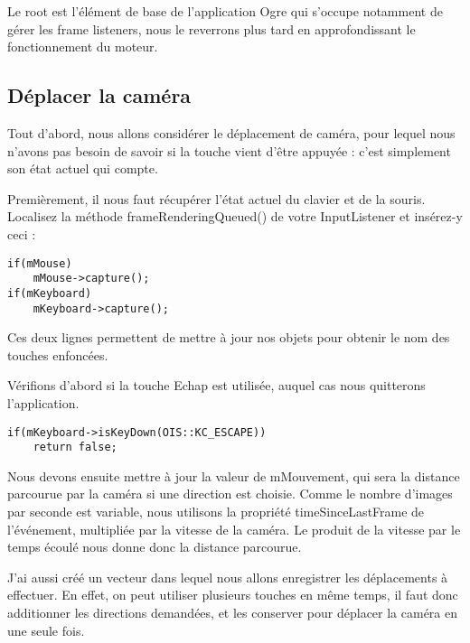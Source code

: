 Le root est l'\'el\'ement de base de l'application Ogre qui s'occupe notamment de g\'erer les frame listeners, nous le reverrons plus tard en approfondissant le fonctionnement du moteur.
 









\subsection{D\'eplacer la cam\'era}


Tout d'abord, nous allons consid\'erer le d\'eplacement de cam\'era, pour lequel nous n'avons pas besoin de savoir si la touche vient d'\^etre appuy\'ee : c'est simplement son \'etat actuel qui compte.

Premi\`erement, il nous faut r\'ecup\'erer l'\'etat actuel du clavier et de la souris. Localisez la m\'ethode frameRenderingQueued() de votre InputListener et ins\'erez-y ceci :


\begin{lstlisting}[caption={}]
if(mMouse)
    mMouse->capture();
if(mKeyboard)
    mKeyboard->capture();
\end{lstlisting}

Ces deux lignes permettent de mettre \`a jour nos objets pour obtenir le nom des touches enfonc\'ees.\newline

V\'erifions d'abord si la touche Echap est utilis\'ee, auquel cas nous quitterons l'application.


\begin{lstlisting}[caption={}]
if(mKeyboard->isKeyDown(OIS::KC_ESCAPE))
    return false;
\end{lstlisting}

Nous devons ensuite mettre \`a jour la valeur de mMouvement, qui sera la distance parcourue par la cam\'era si une direction est choisie. Comme le nombre d'images par seconde est variable, nous utilisons la propri\'et\'e timeSinceLastFrame de l'\'ev\'enement, multipli\'ee par la vitesse de la cam\'era. Le produit de la vitesse par le temps \'ecoul\'e nous donne donc la distance parcourue.

J'ai aussi cr\'e\'e un vecteur dans lequel nous allons enregistrer les d\'eplacements \`a effectuer. En effet, on peut utiliser plusieurs touches en m\^eme temps, il faut donc additionner les directions demand\'ees, et les conserver pour d\'eplacer la cam\'era en une seule fois.


